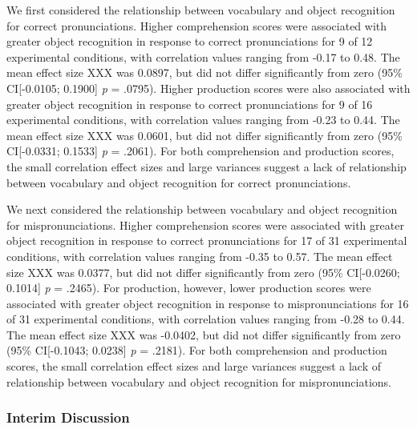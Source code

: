 \documentclass[man]{apa6}
\theoremstyle{definition}
\theoremstyle{definition}
\theoremstyle{definition}
\theoremstyle{remark}
\begin{document}
We first considered the relationship between vocabulary and object
recognition for correct pronunciations. Higher comprehension scores were
associated with greater object recognition in response to correct
pronunciations for 9 of 12 experimental conditions, with correlation
values ranging from -0.17 to 0.48. The mean effect size XXX was 0.0897,
but did not differ significantly from zero (95\% CI{[}-0.0105; 0.1900{]}
\emph{p} = .0795). Higher production scores were also associated with
greater object recognition in response to correct pronunciations for 9
of 16 experimental conditions, with correlation values ranging from
-0.23 to 0.44. The mean effect size XXX was 0.0601, but did not differ
significantly from zero (95\% CI{[}-0.0331; 0.1533{]} \emph{p} = .2061).
For both comprehension and production scores, the small correlation
effect sizes and large variances suggest a lack of relationship between
vocabulary and object recognition for correct pronunciations.

We next considered the relationship between vocabulary and object
recognition for mispronunciations. Higher comprehension scores were
associated with greater object recognition in response to correct
pronunciations for 17 of 31 experimental conditions, with correlation
values ranging from -0.35 to 0.57. The mean effect size XXX was 0.0377,
but did not differ significantly from zero (95\% CI{[}-0.0260; 0.1014{]}
\emph{p} = .2465). For production, however, lower production scores were
associated with greater object recognition in response to
mispronunciations for 16 of 31 experimental conditions, with correlation
values ranging from -0.28 to 0.44. The mean effect size XXX was -0.0402,
but did not differ significantly from zero (95\% CI{[}-0.1043; 0.0238{]}
\emph{p} = .2181). For both comprehension and production scores, the
small correlation effect sizes and large variances suggest a lack of
relationship between vocabulary and object recognition for
mispronunciations.

\subsubsection{Interim Discussion}\label{interim-discussion}
\end{document}
